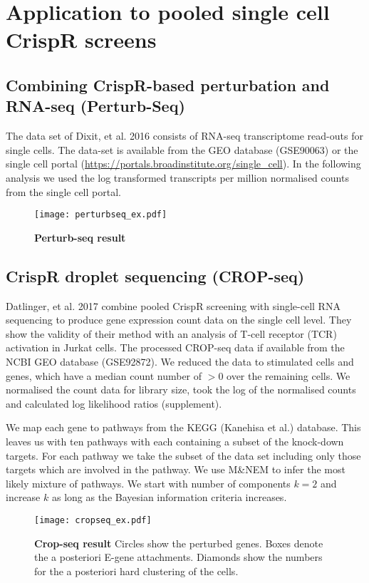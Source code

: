 \documentclass[12pt]{article}
\begin{document}
\section{Application to pooled single cell CrispR screens}

\subsection{Combining CrispR-based perturbation and RNA-seq (Perturb-Seq)}

The data set of Dixit, et al. 2016 consists of RNA-seq transcriptome read-outs for single cells. The data-set is available from the GEO database (GSE90063) or the single cell portal (\url{https://portals.broadinstitute.org/single_cell}). In the following analysis we used the log transformed transcripts per million normalised counts from the single cell portal. 

\begin{figure}
\texttt{[image: perturbseq\_ex.pdf]}
\caption{\textbf{Perturb-seq result}}\label{fig:cropseq}
\end{figure}

\subsection{CrispR droplet sequencing (CROP-seq)}

Datlinger, et al. 2017 combine pooled CrispR screening with single-cell RNA sequencing to produce gene expression count data on the single cell level. They show the validity of their method with an analysis of T-cell receptor (TCR) activation in Jurkat cells. The processed CROP-seq data if available from the NCBI GEO database (GSE92872). We reduced the data to stimulated cells and genes, which have a median count number of $> 0$ over the remaining cells. We normalised the count data for library size, took the log of the normalised counts and calculated log likelihood ratios (supplement).

We map each gene to pathways from the KEGG (Kanehisa et al.) database. This leaves us with ten pathways with each containing a subset of the knock-down targets. For each pathway we take the subset of the data set including only those targets which are involved in the pathway. We use M\&NEM to infer the most likely mixture of pathways. We start with number of components $k=2$ and increase $k$ as long as the Bayesian information criteria increases. 

\begin{figure}
\texttt{[image: cropseq\_ex.pdf]}
\caption{\textbf{Crop-seq result} Circles show the perturbed genes. Boxes denote the a posteriori E-gene attachments. Diamonds show the numbers for the a posteriori hard clustering of the cells. }\label{fig:cropseq}
\end{figure}
\end{document}
